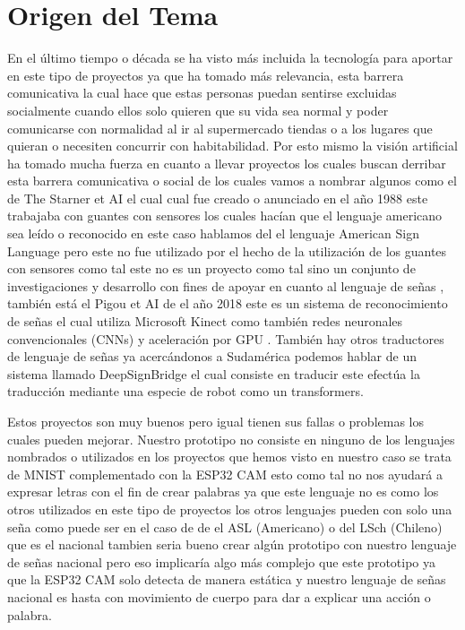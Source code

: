 \documentclass[letter,12pt]{report}
\begin{document}
\section{Origen del Tema}
En el último tiempo o década se ha visto más incluida la tecnología para aportar en este tipo de proyectos ya que ha tomado más relevancia, esta barrera comunicativa la cual hace que estas personas puedan sentirse excluidas socialmente cuando ellos solo quieren que su vida sea normal y poder comunicarse con normalidad al ir al supermercado tiendas o a los lugares que quieran o necesiten concurrir con habitabilidad. Por esto mismo la visión artificial ha tomado mucha fuerza en cuanto a llevar proyectos los cuales buscan derribar esta barrera comunicativa o social de los cuales vamos a nombrar algunos como el de The Starner et AI el cual cual fue creado o anunciado en el año 1988 este trabajaba con guantes con sensores los cuales hacían que el lenguaje americano sea leído o reconocido en este caso hablamos del el lenguaje American Sign Language pero este no fue utilizado por el hecho de la utilización de los guantes con sensores como tal este no es un proyecto 
como tal sino un conjunto de investigaciones  y desarrollo con fines de apoyar en cuanto al lenguaje de señas , también está el Pigou et AI de el año 2018 este es un sistema de reconocimiento de señas el cual utiliza Microsoft Kinect como también redes neuronales convencionales (CNNs) y aceleración por GPU . También hay otros traductores de lenguaje de señas ya acercándonos a Sudamérica podemos hablar de un sistema llamado DeepSignBridge el cual consiste en traducir este efectúa la traducción mediante una especie de robot como un transformers.



 Estos proyectos son muy buenos pero igual tienen sus fallas o problemas los cuales pueden mejorar. Nuestro prototipo no consiste en ninguno de los lenguajes nombrados o utilizados en los proyectos que hemos visto en nuestro caso se trata de MNIST complementado con la ESP32 CAM esto como tal no nos ayudará a expresar letras con el fin de crear palabras ya que este lenguaje no es como los otros utilizados en este tipo de proyectos los otros lenguajes pueden con solo una seña como puede ser en el caso de de el ASL (Americano) o del LSch (Chileno) que es el nacional tambien seria bueno crear algún prototipo con nuestro lenguaje de señas nacional pero eso implicaría algo más complejo que este prototipo ya que la ESP32 CAM solo detecta de manera estática y nuestro lenguaje de señas nacional es hasta con movimiento de cuerpo para dar a explicar una acción o palabra.
\end{document}
